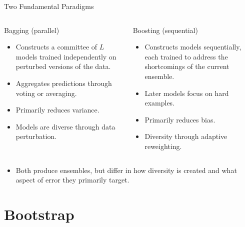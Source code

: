 \begin{frame}{Two Fundamental Paradigms}
  \begin{columns}[t]
      \begin{block}{Bagging (parallel)}
        \begin{itemize}
          \item Constructs a \alert{committee} of $L$ models trained independently on
                perturbed versions of the data.
          \item Aggregates predictions through voting or averaging.
          \item Primarily reduces \alert{variance}.
          \item Models are diverse through data perturbation.
        \end{itemize}
      \end{block}
      \begin{block}{Boosting (sequential)}
        \begin{itemize}
          \item Constructs models \alert{sequentially}, each trained to address the
                shortcomings of the current ensemble.
          \item Later models focus on hard examples.
          \item Primarily reduces \alert{bias}.
          \item Diversity through adaptive reweighting.
        \end{itemize}
      \end{block}
  \end{columns}
  \vspace{0.6em}
  \begin{itemize}
    \item Both produce ensembles, but differ in how diversity is created and what aspect
          of error they primarily target.
  \end{itemize}
\end{frame}

\section{Bootstrap}

